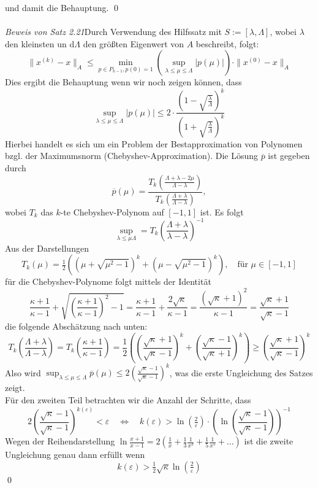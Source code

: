    und damit die Behauptung. \qed \\ \\
    \textit{Beweis von Satz 2.21}Durch Verwendung des Hilfssatz mit $S:=[\lambda, \Lambda]$, 
    wobei $\lambda$ den kleinsten un d$\Lambda$ den größten Eigenwert von $A$ beschreibt, folgt:
    \[\|x^{(k)}-x\|_A \leq \min_{p\in P_{k-1}, p(0)=1} 
    \left(\sup_{\lambda\leq\mu\leq\Lambda}|p(\mu)|\right)\cdot\|x^{(0)}-x\|_A \]
    Dies ergibt die Behauptung wenn wir noch zeigen können, dass 
    \[\sup_{\lambda\leq\mu\leq\Lambda}|p(\mu)| 
    \leq 2\cdot \dfrac{(1-\sqrt{\tfrac{\lambda}{\Lambda}})^k}{(1+\sqrt{\tfrac{\lambda}{\Lambda}})^k}\]
    Hierbei handelt es sich um ein Problem der Bestapproximation von Polynomen bzgl. 
    der Maximumsnorm (Chebyshev-Approximation).
    Die Lösung $\overline{p}$ ist gegeben durch 
    \[\overline{p}(\mu) = \dfrac{T_k(\tfrac{\Lambda+\lambda-2\mu}{\Lambda-\lambda})}
    {T_k(\tfrac{\Lambda+\lambda}{\Lambda-\lambda})},\]
    wobei $T_k$ das $k$-te Chebyshev-Polynom auf $[-1,1]$ ist. Es folgt
    \[\sup_{\lambda\leq\mu\Lambda} = T_k\left(\dfrac{\Lambda+\lambda}{\lambda-\lambda}\right)^{-1}\]
    Aus der Darstellungen
    \[T_k(\mu) = \tfrac{1}{2}\left((\mu+\sqrt{\mu^2-1})^k+(\mu-\sqrt{\mu^2-1})^k\right), 
    \quad \text{für } \mu\in[-1,1]\]
    für die Chebyshev-Polynome folgt mittels der Identität
    \[\dfrac{\kappa+1}{\kappa-1} + \sqrt{\left(\dfrac{\kappa+1}{\kappa-1}\right)^2-1} 
    = \dfrac{\kappa+1}{\kappa-1} + \dfrac{2\sqrt{\kappa}}{\kappa-1} = \dfrac{(\sqrt{\kappa}+1)^2}{\kappa - 1}
    = \dfrac{\sqrt{\kappa}+1}{\sqrt{\kappa}-1}\]
    die folgende Abschätzung nach unten:
    \[T_k\left(\dfrac{\Lambda+\lambda}{\Lambda-\lambda}\right) = T_k\left(\dfrac{\kappa+1}{\kappa-1}\right)
    = \dfrac{1}{2}\left(\left(\dfrac{\sqrt{\kappa}+1}{\sqrt{\kappa}-1}\right)^k + 
    \left(\dfrac{\sqrt{\kappa}-1}{\sqrt{\kappa}+1}\right)^k\right) 
    \geq \left(\dfrac{\sqrt{\kappa}+1}{\sqrt{\kappa}-1}\right)^k\]
    Also wird $\sup_{\lambda\leq\mu\leq\Lambda}\overline{p}(\mu)
    \leq 2\left(\tfrac{\sqrt{\kappa}-1}{\sqrt{\kappa}-1}\right)^k$, was die erste Ungleichung des Satzes zeigt. \\
    Für den zweiten Teil betrachten wir die Anzahl der Schritte, dass
    \[2\left(\dfrac{\sqrt{\kappa}-1}{\sqrt{\kappa}-1}\right)^{k(\varepsilon)} < \varepsilon \quad \iff \quad 
    k(\varepsilon) > \ln(\tfrac{2}{\varepsilon})\cdot
    \left(\ln\left(\dfrac{\sqrt{\kappa}-1}{\sqrt{\kappa}-1}\right)\right)^{-1}\]
    Wegen der Reihendarstellung $\ln\tfrac{x+1}{x-1} = 2(\tfrac{1}{x} + \tfrac{1}{3}\tfrac{1}{x^3} 
    + \tfrac{1}{5}\tfrac{1}{x^5} + \dotsc)$ ist die zweite Ungleichung genau dann erfüllt wenn 
    \[k(\varepsilon) > \tfrac{1}{2}\sqrt{\kappa}\ln(\tfrac{2}{\varepsilon})\]
    \qed